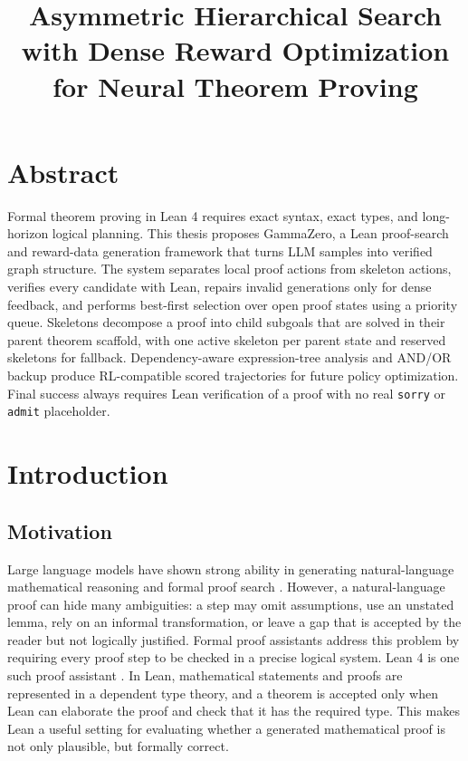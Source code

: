 \documentclass[en]{uet_awesome_thesis/uet-awesome-thesis}
\title{Asymmetric Hierarchical Search with Dense Reward Optimization for Neural Theorem Proving}
\author{}
\begin{document}
\maketitle
{}

\chapter*{Abstract}
Formal theorem proving in Lean 4 requires exact syntax, exact types, and long-horizon logical planning. This thesis proposes GammaZero, a Lean proof-search and reward-data generation framework that turns LLM samples into verified graph structure. The system separates local proof actions from skeleton actions, verifies every candidate with Lean, repairs invalid generations only for dense feedback, and performs best-first selection over open proof states using a priority queue. Skeletons decompose a proof into child subgoals that are solved in their parent theorem scaffold, with one active skeleton per parent state and reserved skeletons for fallback. Dependency-aware expression-tree analysis and AND/OR backup produce RL-compatible scored trajectories for future policy optimization. Final success always requires Lean verification of a proof with no real \texttt{sorry} or \texttt{admit} placeholder.
\clearpage

\tableofcontents
{}
\listoffigures
{}
\listoftables

\newpage
{}

\chapter{Introduction}

\section{Motivation}

Large language models have shown strong ability in generating natural-language mathematical reasoning and formal proof search \citep{polu2020gptf,yang2023leandojo,xin2024deepseekproverv15}. 
However, a natural-language proof can hide many ambiguities: a step may omit assumptions, use an unstated lemma, rely on an informal transformation, or leave a gap that is accepted by the reader but not logically justified.
Formal proof assistants address this problem by requiring every proof step to be checked in a precise logical system. Lean 4 is one such proof assistant \citep{demoura2021lean4}. In Lean, mathematical statements and proofs are represented in a dependent type theory, and a theorem is accepted only when Lean can elaborate the proof and check that it has the required type. This makes Lean a useful setting for evaluating whether a generated mathematical proof is not only plausible, but formally correct.
\end{document}
